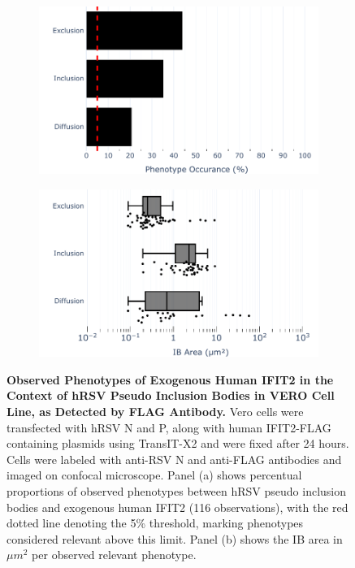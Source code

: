 \begin{figure}
    \begin{subfigure}{0.495\textwidth}
        \caption{}
        \includegraphics[width=1\linewidth]{08. Chapter 3/Figs/03. pIB/03. IFIT2/04. IFIT2-FLAG/03. FLAG/01. bar_hi2f_hnhp.pdf}
    \end{subfigure}
    \begin{subfigure}{0.495\textwidth}
        \caption{}
        \includegraphics[width=1\linewidth]{08. Chapter 3/Figs/03. pIB/03. IFIT2/04. IFIT2-FLAG/03. FLAG/02. box_hi2f_hnhp.pdf}
    \end{subfigure}
    \caption[Observed Phenotypes of Exogenous Human IFIT2 in the Context of hRSV Pseudo Inclusion Bodies in VERO Cell Line, as Detected by FLAG Antibody.]{\textbf{Observed Phenotypes of Exogenous Human IFIT2 in the Context of hRSV Pseudo Inclusion Bodies in VERO Cell Line, as Detected by FLAG Antibody.} Vero cells were transfected with hRSV N and P, along with human IFIT2-FLAG containing plasmids using TransIT-X2 and were fixed after 24 hours. Cells were labeled with anti-RSV N and anti-FLAG antibodies and imaged on confocal microscope. Panel (a) shows percentual proportions of observed phenotypes between hRSV pseudo inclusion bodies and exogenous human IFIT2 (116 observations), with the red dotted line denoting the 5\% threshold, marking phenotypes considered relevant above this limit. Panel (b) shows the IB area in \(\mu m^2\) per observed relevant phenotype.}
    \label{fig:Observed Phenotypes of Exogenous Human IFIT2 in the Context of hRSV Pseudo Inclusion Bodies in VERO Cell Line, as Detected by FLAG Antibody}
\end{figure}

